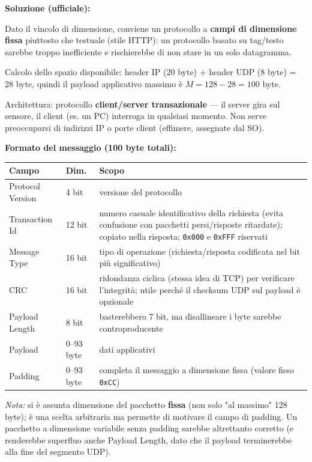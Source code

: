 \documentclass[12pt, a4paper]{article}
\begin{document}
\textbf{Soluzione (ufficiale):}

Dato il vincolo di dimensione, conviene un protocollo a \textbf{campi di dimensione fissa} piuttosto che testuale (stile HTTP): un protocollo basato su tag/testo sarebbe troppo inefficiente e rischierebbe di non stare in un solo datagramma.

Calcolo dello spazio disponibile: header IP (20 byte) + header UDP (8 byte) = 28 byte, quindi il payload applicativo massimo è $M = 128 - 28 = 100$ byte.

Architettura: protocollo \textbf{client/server transazionale} --- il server gira sul sensore, il client (es. un PC) interroga in qualsiasi momento. Non serve preoccuparsi di indirizzi IP o porte client (effimere, assegnate dal SO).

\textbf{Formato del messaggio (100 byte totali):}
\begin{center}
\begin{tabular}{|l|l|p{6cm}|}
\hline
\textbf{Campo} & \textbf{Dim.} & \textbf{Scopo} \\
\hline
Protocol Version & 4 bit & versione del protocollo \\
Transaction Id & 12 bit & numero casuale identificativo della richiesta (evita confusione con pacchetti persi/risposte ritardate); copiato nella risposta; \texttt{0x000} e \texttt{0xFFF} riservati \\
Message Type & 16 bit & tipo di operazione (richiesta/risposta codificata nel bit più significativo) \\
CRC & 16 bit & ridondanza ciclica (stessa idea di TCP) per verificare l'integrità; utile perché il checksum UDP sul payload è opzionale \\
Payload Length & 8 bit & basterebbero 7 bit, ma disallineare i byte sarebbe controproducente \\
Payload & 0--93 byte & dati applicativi \\
Padding & 0--93 byte & completa il messaggio a dimensione fissa (valore fisso \texttt{0xCC}) \\
\hline
\end{tabular}
\end{center}

\textit{Nota:} si è assunta dimensione del pacchetto \textbf{fissa} (non solo "al massimo" 128 byte); è una scelta arbitraria ma permette di motivare il campo di padding. Un pacchetto a dimensione variabile senza padding sarebbe altrettanto corretto (e renderebbe superfluo anche Payload Length, dato che il payload terminerebbe alla fine del segmento UDP).
\end{document}
